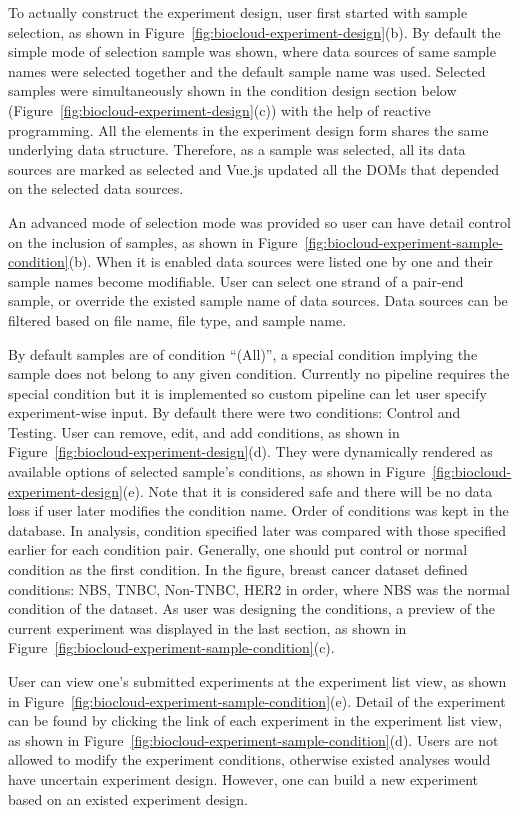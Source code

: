To actually construct the experiment design, user first started with sample
selection, as shown in Figure~\ref{fig:biocloud-experiment-design}(b). By
default the simple mode of selection sample was shown, where data sources of
same sample names were selected together and the default sample name was used.
Selected samples were simultaneously shown in the condition design section
below (Figure~\ref{fig:biocloud-experiment-design}(c)) with the help of
reactive programming. All the elements in the experiment design form shares the
same underlying data structure. Therefore, as a sample was selected, all its
data sources are marked as selected and Vue.js updated all the DOMs that
depended on the selected data sources.

An advanced mode of selection mode was provided so user can have detail control
on the inclusion of samples, as shown in
Figure~\ref{fig:biocloud-experiment-sample-condition}(b). When it is enabled
data sources were listed one by one and their sample names become modifiable.
User can select one strand of a pair-end sample, or override the existed sample
name of data sources. Data sources can be filtered based on file name, file
type, and sample name.

By default samples are of condition ``(All)'', a special condition implying the
sample does not belong to any given condition. Currently no pipeline requires
the special condition but it is implemented so custom pipeline can let user
specify experiment-wise input. By default there were two conditions: Control
and Testing. User can remove, edit, and add conditions, as shown in
Figure~\ref{fig:biocloud-experiment-design}(d). They were dynamically rendered
as available options of selected sample's conditions, as shown in
Figure~\ref{fig:biocloud-experiment-design}(e). Note that it is considered safe
and there will be no data loss if user later modifies the condition name.
Order of conditions was kept in the database. In analysis, condition specified
later was compared with those specified earlier for each condition pair.
Generally, one should put control or normal condition as the first condition.
In the figure, breast cancer dataset defined conditions: NBS, TNBC, Non-TNBC,
HER2 in order, where NBS was the normal condition of the dataset. As user was
designing the conditions, a preview of the current experiment was displayed in
the last section, as shown in
Figure~\ref{fig:biocloud-experiment-sample-condition}(c).

User can view one's submitted experiments at the experiment list view, as shown
in Figure~\ref{fig:biocloud-experiment-sample-condition}(e). Detail of the
experiment can be found by clicking the link of each experiment in the
experiment list view, as shown in
Figure~\ref{fig:biocloud-experiment-sample-condition}(d). Users are not allowed
to modify the experiment conditions, otherwise existed analyses would have
uncertain experiment design. However, one can build a new experiment based on
an existed experiment design.



